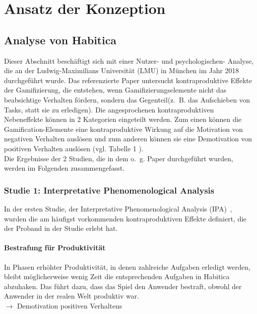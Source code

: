\documentclass[sigconf, nonacm]{acmart}
\begin{document}
\section{Ansatz der Konzeption}\label{sec:conception}

\subsection{Analyse von Habitica}\label{sec:analysis}
Dieser Abschnitt beschäftigt sich mit einer Nutzer- und psychologischen- Analyse, die an der Ludwig-Maximilians Universität (LMU) in München im Jahr 2018 durchgeführt wurde\cite{diefenbach_counterproductive_2019}. Das referenzierte Paper untersucht kontraproduktive Effekte der Gamifizierung, die entstehen, wenn Gamifizierungselemente nicht das beabsichtige Verhalten fördern, sondern das Gegenteil(z.~B. das Aufschieben von Tasks, statt sie zu erledigen). 
Die angesprochenen kontraproduktiven Nebeneffekte können in 2 Kategorien eingeteilt werden. Zum einen können die Gamification-Elemente eine kontraproduktive Wirkung auf die Motivation von negativen Verhalten auslösen und zum anderen können sie eine Demotivation von positiven Verhalten auslösen (vgl. Tabelle 1 \cite{diefenbach_counterproductive_2019}).
\\
Die Ergebnisse der 2 Studien, die in dem o.~g. Paper durchgeführt wurden, werden im Folgenden zusammengefasst.
\\

\subsubsection{Studie 1: Interpretative Phenomenological Analysis}
In der ersten Studie, der  Interpretative Phenomenological Analysis (IPA)~\cite{smith_reflecting_2004}, wurden die am häufigst vorkommenden kontraproduktiven Effekte definiert, die der Proband in der Studie erlebt hat.

\paragraph{Bestrafung für Produktivität}\label{sec:cpe1}
In Phasen erhöhter Produktivität, in denen zahlreiche Aufgaben erledigt werden, bleibt möglicherweise wenig Zeit die entsprechenden Aufgaben in Habitica abzuhaken. Das führt dazu, dass das Spiel den Anwender bestraft, obwohl der Anwender in der realen Welt produktiv war.\\
$\rightarrow$ Demotivation positiven Verhaltens
\end{document}
